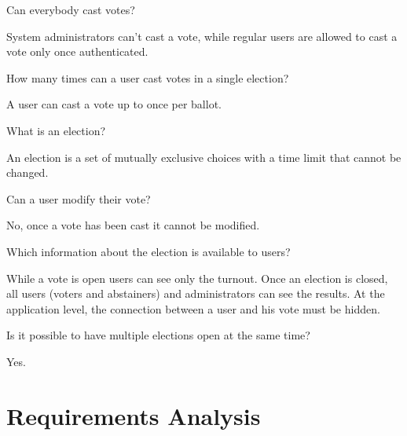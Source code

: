 \documentclass{scrartcl}
\begin{document}
\begin{Question}
    Can everybody cast votes?
\end{Question}
\begin{Answer}
    System administrators can't cast a vote, while regular users are allowed to cast a vote only once authenticated.
\end{Answer}

\begin{Question}
    How many times can a user cast votes in a single election?
\end{Question}
\begin{Answer}
    A user can cast a vote up to once per ballot.
\end{Answer}

\begin{Question}
    What is an election?
\end{Question}
\begin{Answer}
    An election is a set of mutually exclusive choices with a time limit that cannot be changed.
\end{Answer}

\begin{Question}
    Can a user modify their vote?
\end{Question}
\begin{Answer}
    No, once a vote has been cast it cannot be modified.
\end{Answer}

\begin{Question}
    Which information about the election is available to users?
\end{Question}
\begin{Answer}
    While a vote is open users can see only the turnout. Once an election is closed, all users (voters and abstainers) and administrators can see the results. At the application level, the connection between a user and his vote must be hidden.
\end{Answer}

\begin{Question}
    Is it possible to have multiple elections open at the same time?
\end{Question}
\begin{Answer}
    Yes.
\end{Answer}


\section{Requirements Analysis}
\end{document}
